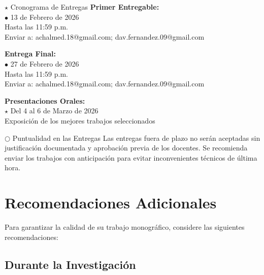 \documentclass[12pt,a4paper]{article}
\begin{document}
\begin{datebox}{$\star$ Cronograma de Entregas}
  \textbf{Primer Entregable:}\\
  \textcolor{secondaryblue}{$\bullet$ 13 de Febrero de 2026}\\
  Hasta las 11:59 p.m.\\
  Enviar a: achalmed.18@gmail.com; dav.fernandez.09@gmail.com
  
  \vspace{0.5cm}
  
  \textbf{Entrega Final:}\\
  \textcolor{secondaryblue}{$\bullet$ 27 de Febrero de 2026}\\
  Hasta las 11:59 p.m.\\
  Enviar a: achalmed.18@gmail.com; dav.fernandez.09@gmail.com
  
  \vspace{0.5cm}
  
  \textbf{Presentaciones Orales:}\\
  \textcolor{accentgold}{$\star$ Del 4 al 6 de Marzo de 2026}\\
  Exposición de los mejores trabajos seleccionados
\end{datebox}

\begin{warningbox}{$\bigcirc$ Puntualidad en las Entregas}
  Las entregas fuera de plazo no serán aceptadas sin justificación documentada y aprobación previa de los docentes. Se recomienda enviar los trabajos con anticipación para evitar inconvenientes técnicos de última hora.
\end{warningbox}

\section{Recomendaciones Adicionales}

Para garantizar la calidad de su trabajo monográfico, considere las siguientes recomendaciones:

\subsection{Durante la Investigación}
\end{document}
